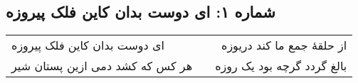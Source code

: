 \begin{center}
\section*{شماره ۱: ای دوست بدان کاین فلک پیروزه}
\label{sec:001}
\begin{longtable}{l p{0.5cm} r}
ای دوست بدان کاین فلک پیروزه
&&
از حلقهٔ جمع ما کند دریوزه
\\
هر کس که کشد دمی ازین پستان شیر
&&
بالغ گردد گرچه بود یک روزه
\\
\end{longtable}
\end{center}
